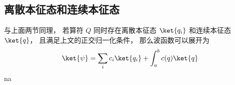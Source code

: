 \subsection{离散本征态和连续本征态}
与上面两节同理， 若算符 $Q$ 同时存在离散本征态 $\ket{q_i}$ 和连续本征态 $\ket{q}$， 且满足上文的正交归一化条件， 那么波函数可以展开为
\begin{equation}
\ket{\psi} = \sum_i c_i \ket{q_i} + \int_a^b c(q) \ket{q}
\end{equation}
na





